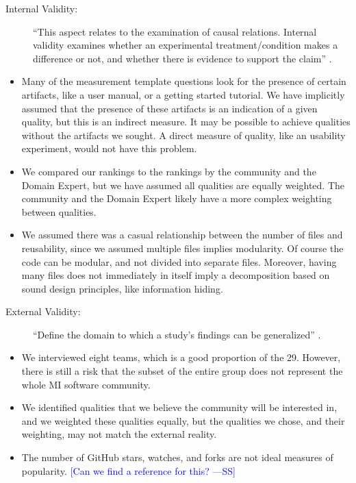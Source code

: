 \documentclass[final, 3p, times, authoryear]{elsarticle}
\newcommand{\authornote}[3]{\textcolor{#1}{[#3 ---#2]}}
\newcommand{\authornote}[3]{}
\newcommand{\wss}[1]{\authornote{blue}{SS}{#1}} %
\begin{document}
\begin{description}
    \item[Internal Validity:] ``This aspect relates to the examination of causal
    relations. Internal validity examines whether an experimental
    treatment/condition makes a difference or not, and whether there is evidence
    to support the claim'' \citep{AmpatzoglouEtAl2019}.
\end{description}

\begin{itemize}
    \item Many of the measurement template questions look for the presence of
    certain artifacts, like a user manual, or a getting started tutorial.  We
    have implicitly assumed that the presence of these artifacts is an
    indication of a given quality, but this is an indirect measure.  It may be
    possible to achieve qualities without the artifacts we sought.  A direct
    measure of quality, like an usability experiment, would not have this
    problem.
    \item We compared our rankings to the rankings by the community and the
    Domain Expert, but we have assumed all qualities are equally weighted.  The
    community and the Domain Expert likely have a more complex weighting between
    qualities.
    \item We assumed there was a casual relationship between the number of files
    and reusability, since we assumed multiple files implies modularity.  Of
    course the code can be modular, and not divided into separate files.
    Moreover, having many files does not immediately in itself imply a
    decomposition based on sound design principles, like information hiding.
\end{itemize}

\begin{description}
    \item[External Validity:] ``Define the domain to which a study's findings
    can be generalized'' \citep{ZhouEtAl2016}.
\end{description}

\begin{itemize}
\item We interviewed eight teams, which is a good proportion of the 29. However,
there is still a risk that the subset of the entire group does not represent the
whole MI software community.
\item We identified qualities that we believe the community will be interested
in, and we weighted these qualities equally, but the qualities we chose, and
their weighting, may not match the external reality.
\item The number of GitHub stars, watches, and forks are not ideal measures of
popularity.  \wss{Can we find a reference for this?}
\end{itemize}
\end{document}
